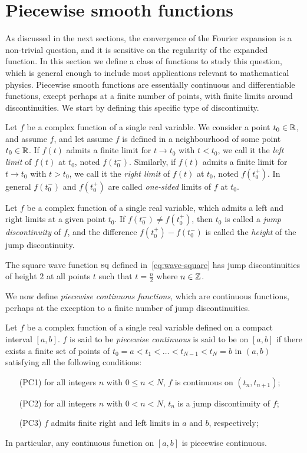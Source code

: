 \section{Piecewise smooth functions}
As discussed in the next sections, the convergence of the Fourier expansion is a
non-trivial question, and it is sensitive on the regularity of the expanded function. In
this section we define a class of functions to study this question, which is general
enough to include most applications relevant to mathematical physics. Piecewise smooth
functions are essentially continuous and differentiable functions, except perhaps at a
finite number of points, with finite limits around discontinuities. We start by defining
this specific type of discontinuity.
\begin{definition}
  \label{def:limit-onesided}
  Let $f$ be a complex function of a single real variable. We consider a point $t_0\in\mathbb{R}$,
  and assume $f$, and let assume $f$ is defined in a neighbourhood of some point
  $t_0\in\mathbb{R}$. If $f(t)$ admits a finite limit for $t\to t_0$ with $t<t_0$, we call it the
  \emph{left limit} of $f(t)$ at $t_0$, noted $f(t_0^-)$. Similarly, if $f(t)$ admits a
  finite limit for $t\to t_0$ with $t>t_0$, we call it the \emph{right limit} of $f(t)$ at
  $t_0$, noted $f(t_0^+)$. In general $f(t_0^-)$ and $f(t_0^+)$ are called
  \emph{one-sided} limits of $f$ at $t_0$.
\end{definition}
\begin{definition}
  Let $f$ be a complex function of a single real variable, which admits a left and right
  limits at a given point $t_0$. If $f(t_0^-)\neq f(t_0^+)$, then $t_0$ is called a
  \emph{jump discontinuity} of $f$, and the difference $f(t_0^+)-f(t_0^-)$ is called the
  \emph{height} of the jump discontinuity.
\end{definition}
\begin{example}
  The square wave function $\operatorname{sq}$ defined in~\cref{eq:wave-square} has jump discontinuities
  of height $2$ at all points $t$ such that $t=\frac{n}{2}$ where $n\in\mathbb{Z}$.
\end{example}
We now define \emph{piecewise continuous functions}, which are continuous functions,
perhaps at the exception to a finite number of jump discontinuities.
\begin{definition}
  \label{def:pw-cont}
  Let $f$ be a complex function of a single real variable defined on a compact interval
  $[a,b]$. $f$ is said to be \emph{piecewise continuous} is said to be on $[a,b]$ if there
  exists a finite set of points of $t_0=a<t_1<\dots<t_{N-1}<t_N=b$ in $(a,b)$ satisfying
  all the following conditions:
  \begin{itemize}
    \item[(PC1)] for all integers $n$ with $0\leq n< N$, $f$ is continuous on
      $(t_n,t_{n+1})$;
    \item[(PC2)] for all integers $n$ with $0< n< N$, $t_n$ is a jump discontinuity of
      $f$;
    \item[(PC3)] $f$ admits finite right and left limits in $a$ and $b$, respectively;
  \end{itemize}
  In particular, any continuous function on $[a,b]$ is piecewise continuous.
\end{definition}
